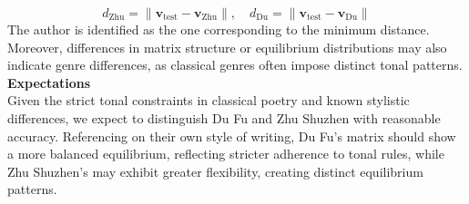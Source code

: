 \documentclass[12pt]{article}
\begin{document}
\[
    d_{\text{Zhu}} = \|\mathbf{v}_{\text{test}} - \mathbf{v}_{\text{Zhu}}\|, \quad d_{\text{Du}} = \|\mathbf{v}_{\text{test}} - \mathbf{v}_{\text{Du}}\|
\]
The author is identified as the one corresponding to the minimum distance. Moreover, differences in matrix structure or equilibrium distributions may also indicate genre differences, as classical genres often impose distinct tonal patterns.
\\
\textbf{Expectations}
\\
Given the strict tonal constraints in classical poetry and known stylistic differences, we expect to distinguish Du Fu and Zhu Shuzhen with reasonable accuracy. 
Referencing on their own style of writing, Du Fu's matrix should show a more balanced equilibrium, reflecting stricter adherence to tonal rules,
while Zhu Shuzhen's may exhibit greater flexibility, creating distinct equilibrium patterns.
\end{document}
